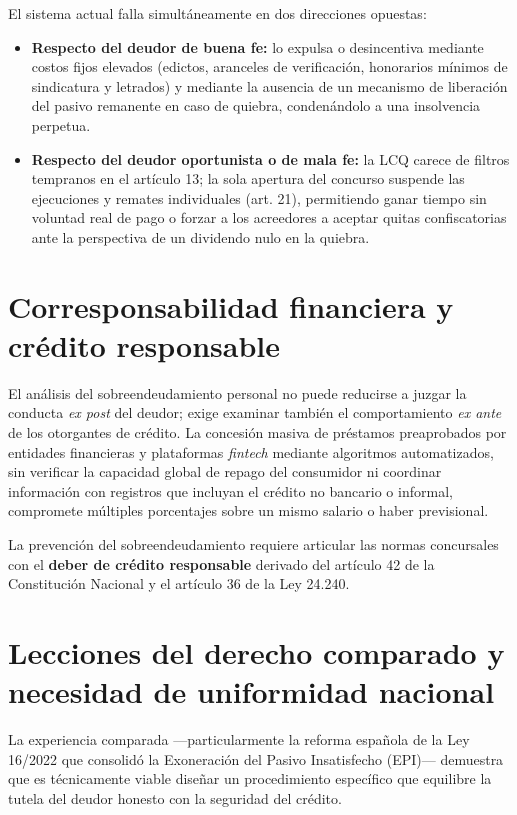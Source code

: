 \documentclass[12pt,oneside]{book}
\begin{document}
El sistema actual falla simultáneamente en dos direcciones opuestas:

\begin{itemize}
    \item \textbf{Respecto del deudor de buena fe:} lo expulsa o desincentiva mediante costos fijos elevados (edictos, aranceles de verificación, honorarios mínimos de sindicatura y letrados) y mediante la ausencia de un mecanismo de liberación del pasivo remanente en caso de quiebra, condenándolo a una insolvencia perpetua.
    \item \textbf{Respecto del deudor oportunista o de mala fe:} la LCQ carece de filtros tempranos en el artículo 13; la sola apertura del concurso suspende las ejecuciones y remates individuales (art. 21), permitiendo ganar tiempo sin voluntad real de pago o forzar a los acreedores a aceptar quitas confiscatorias ante la perspectiva de un dividendo nulo en la quiebra.
\end{itemize}

\section{Corresponsabilidad financiera y crédito responsable}

El análisis del sobreendeudamiento personal no puede reducirse a juzgar la conducta \textit{ex post} del deudor; exige examinar también el comportamiento \textit{ex ante} de los otorgantes de crédito. La concesión masiva de préstamos preaprobados por entidades financieras y plataformas \textit{fintech} mediante algoritmos automatizados, sin verificar la capacidad global de repago del consumidor ni coordinar información con registros que incluyan el crédito no bancario o informal, compromete múltiples porcentajes sobre un mismo salario o haber previsional.

La prevención del sobreendeudamiento requiere articular las normas concursales con el \textbf{deber de crédito responsable} derivado del artículo 42 de la Constitución Nacional y el artículo 36 de la Ley 24.240.

\section{Lecciones del derecho comparado y necesidad de uniformidad nacional}

La experiencia comparada ---particularmente la reforma española de la Ley 16/2022 que consolidó la Exoneración del Pasivo Insatisfecho (EPI)--- demuestra que es técnicamente viable diseñar un procedimiento específico que equilibre la tutela del deudor honesto con la seguridad del crédito.
\end{document}
